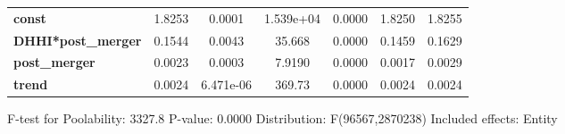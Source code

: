 \documentclass{report}
\begin{document}
\begin{center}
\begin{tabular}{lcccccc}
\midrule
\textbf{const}             &       1.8253       &       0.0001       &    1.539e+04    &      0.0000      &       1.8250      &       1.8255       \\
\textbf{DHHI*post\_merger} &       0.1544       &       0.0043       &      35.668     &      0.0000      &       0.1459      &       0.1629       \\
\textbf{post\_merger}      &       0.0023       &       0.0003       &      7.9190     &      0.0000      &       0.0017      &       0.0029       \\
\textbf{trend}             &       0.0024       &     6.471e-06      &      369.73     &      0.0000      &       0.0024      &       0.0024       \\
\bottomrule
\end{tabular}
\end{center}

F-test for Poolability: 3327.8 \newline
 P-value: 0.0000 \newline
 Distribution: F(96567,2870238) \newline
  \newline
 Included effects: Entity
\end{document}
